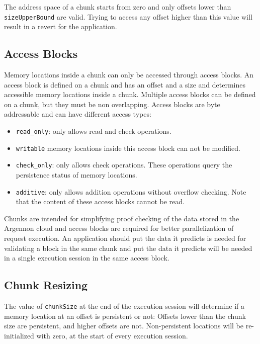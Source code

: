 The address space of a chunk starts from zero and only offsets lower than \texttt{sizeUpperBound} are valid. Trying to
access any offset higher than this value will result in a revert for the application.

\subsection{Access Blocks}\label{subsec:access-blocks}

Memory locations inside a chunk can only be accessed through access blocks. An access block is defined on a chunk
and has an offset and a size and determines accessible memory locations inside a chunk. Multiple access blocks can
be defined on a chunk, but they must be non overlapping. Access blocks are byte addressable and can have different
access types:

\begin{itemize}
    \item \texttt{read\_only}: only allows read and check operations.
    \item \texttt{writable} memory locations inside this access block can not be modified.
    \item \texttt{check\_only}: only allows check operations. These operations query the persistence
    status of memory locations.
    \item \texttt{additive}: only allows addition operations without overflow checking. Note that the content of these
    access blocks cannot be read.
\end{itemize}

Chunks are intended for simplifying proof checking of the data stored in the Argennon cloud and access blocks are
required for better parallelization of request execution. An application should put the data it predicts is needed for
validating a block in the same chunk and put the data it predicts will be needed in a single execution session in
the same access block.

\subsection{Chunk Resizing}\label{subsec:ch-resize}

The value of \texttt{chunkSize} at the end of the execution session will determine if a memory location at an
offset is persistent or not: Offsets lower than the chunk size are persistent, and higher offsets are not.
Non-persistent locations will be re-initialized with zero, at the start of every execution session.

